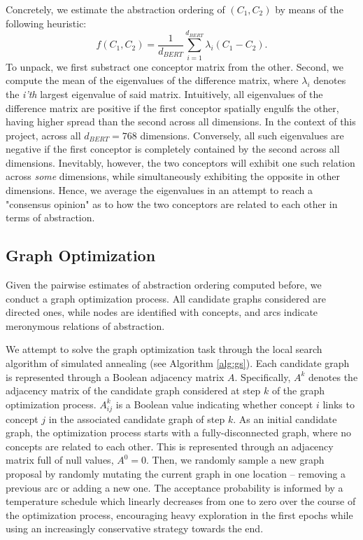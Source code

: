 Concretely, we estimate the abstraction ordering of $(C_1, C_2)$ by means of the following heuristic:$$f(C_1, C_2) = \frac{1}{d_{BERT}} \sum\limits_{i=1}^{d_{BERT}} \lambda_i(C_1 - C_2).$$ To unpack, we first substract one conceptor matrix from the other. Second, we compute the mean of the eigenvalues of the difference matrix, where $\lambda_i$ denotes the \textit{i'th} largest eigenvalue of said matrix. Intuitively, all eigenvalues of the difference matrix are positive if the first conceptor spatially engulfs the other, having higher spread than the second across all dimensions. In the context of this project, across all $d_{BERT} = 768$ dimensions. Conversely, all such eigenvalues are negative if the first conceptor is completely contained by the second across all dimensions. Inevitably, however, the two conceptors will exhibit one such relation across \textit{some} dimensions, while simultaneously exhibiting the opposite in other dimensions. Hence, we average the eigenvalues in an attempt to reach a "consensus opinion" as to how the two conceptors are related to each other in terms of abstraction.

\subsection{Graph Optimization}

Given the pairwise estimates of abstraction ordering computed before, we conduct a graph optimization process. All candidate graphs considered are directed ones, while nodes are identified with concepts, and arcs indicate meronymous relations of abstraction.

We attempt to solve the graph optimization task through the local search algorithm of simulated annealing (see Algorithm \ref{alg:gs}). Each candidate graph is represented through a Boolean adjacency matrix $A$. Specifically, $A^k$ denotes the adjacency matrix of the candidate graph considered at step $k$ of the graph optimization process. $A^k_{ij}$ is a Boolean value indicating whether concept $i$ links to concept $j$ in the associated candidate graph of step $k$. As an initial candidate graph, the optimization process starts with a fully-disconnected graph, where no concepts are related to each other. This is represented through an adjacency matrix full of null values, $A^0 = 0$. Then, we randomly sample a new graph proposal by randomly mutating the current graph in one location -- removing a previous arc or adding a new one. The acceptance probability is informed by a temperature schedule which linearly decreases from one to zero over the course of the optimization process, encouraging heavy exploration in the first epochs while using an increasingly conservative strategy towards the end.


